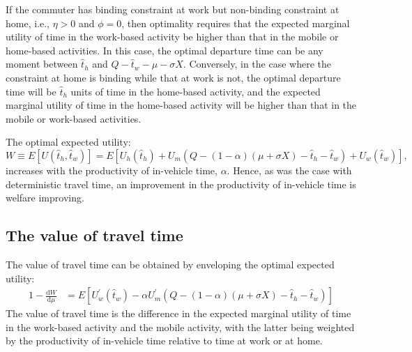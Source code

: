 \documentclass[12pt,a4paper,british]{article}
\begin{document}
If the commuter has binding constraint at work but non-binding constraint at home, i.e., $\eta>0$ and $\phi=0$, then optimality requires that the expected marginal utility of time in the work-based activity be higher than that in the mobile or home-based activities. In this case, the optimal departure time can be any moment between $\hat{t}_{h}$ and $Q-\hat{t}_{w}-\mu-\sigma X$. Conversely, in the case where the constraint at home is binding while that at work is not, the optimal departure time will be $\hat{t}_{h}$ units of time in the home-based activity, and the expected marginal utility of time in the home-based activity will be higher than that in the mobile or work-based activities.

The optimal expected utility: 
\begin{equation*}
W\equiv E\left[U\left(\hat{t}_{h},\hat{t}_{w}\right)\right]=E\left[U_{h}\left(\hat{t}_{h}\right)+U_{m}\left(Q-\left(1-\alpha\right)\left(\mu+\sigma X\right)-\hat{t}_{h}-\hat{t}_{w}\right)+U_{w}\left(\hat{t}_{w}\right)\right],
\end{equation*}
increases with the productivity of in-vehicle time, $\alpha$. Hence, as was the case with deterministic travel time, an improvement in the productivity of in-vehicle time is welfare improving.



\subsection*{The value of travel time}

The value of travel time can be obtained by enveloping the optimal expected utility:
\begin{alignat*}{1}
-\frac{\mathrm{d}W}{\mathrm{d}\mu} & = E\left[ U_{w}^{\prime}\left( \hat{t}_{w} \right) - \alpha U_{m}^{\prime}\left( Q - \left(1 - \alpha \right) \left( \mu + \sigma X \right) - \hat{t}_{h} - \hat{t}_{w} \right)\right]
\end{alignat*}
The value of travel time is the difference in the expected marginal utility of time in the work-based activity and the mobile activity, with the latter being weighted by the productivity of in-vehicle time relative to time at work or at home. 
\end{document}
